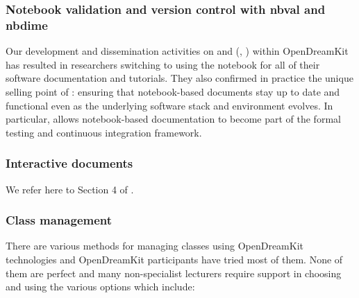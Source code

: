 \documentclass{deliverablereport}
\begin{document}
\subsubsection{Notebook validation and version control with nbval and nbdime}

Our development and dissemination activities on \nbval and \nbdime
(, ) within
OpenDreamKit has resulted in researchers switching to using the
notebook for all of their software documentation and tutorials. They
also confirmed in practice the unique selling point of \nbval:
ensuring that notebook-based documents stay up to date and functional
even as the underlying software stack and environment evolves. In
particular, \nbval allows notebook-based documentation to become part
of the formal testing and continuous integration framework.

\subsubsection{Interactive documents}

We refer here to Section 4 of .

\subsubsection{Class management}

There are various methods for managing classes using OpenDreamKit
technologies and OpenDreamKit participants have tried most of them. None
of them are perfect and many non-specialist lecturers require support in
choosing and using the various options which include:
\end{document}

